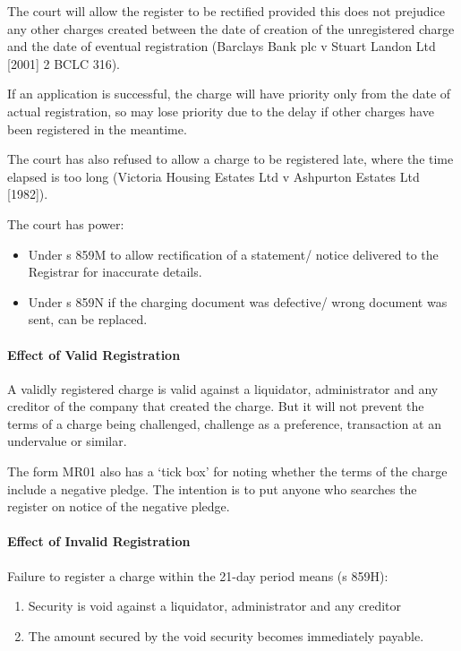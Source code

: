\documentclass[
]{article}
\providecommand{\tightlist}{%
  \setlength{\itemsep}{0pt}\setlength{\parskip}{0pt}}
\begin{document}
The court will allow the register to be rectified provided this does not
prejudice any other charges created between the date of creation of the
unregistered charge and the date of eventual registration (Barclays Bank
plc v Stuart Landon Ltd {[}2001{]} 2 BCLC 316).

If an application is successful, the charge will have priority only from
the date of actual registration, so may lose priority due to the delay
if other charges have been registered in the meantime.

The court has also refused to allow a charge to be registered late,
where the time elapsed is too long (Victoria Housing Estates Ltd v
Ashpurton Estates Ltd {[}1982{]}).

The court has power:

\begin{itemize}
\tightlist
\item
  Under s 859M to allow rectification of a statement/ notice delivered
  to the Registrar for inaccurate details.
\item
  Under s 859N if the charging document was defective/ wrong document
  was sent, can be replaced.
\end{itemize}

\hypertarget{effect-of-valid-registration}{%
\paragraph{Effect of Valid
Registration}\label{effect-of-valid-registration}}

A validly registered charge is valid against a liquidator, administrator
and any creditor of the company that created the charge. But it will not
prevent the terms of a charge being challenged, challenge as a
preference, transaction at an undervalue or similar.

The form MR01 also has a `tick box' for noting whether the terms of the
charge include a negative pledge. The intention is to put anyone who
searches the register on notice of the negative pledge.

\hypertarget{effect-of-invalid-registration}{%
\paragraph{Effect of Invalid
Registration}\label{effect-of-invalid-registration}}

Failure to register a charge within the 21-day period means (s 859H):

\begin{enumerate}
\tightlist
\item
  Security is void against a liquidator, administrator and any creditor
\item
  The amount secured by the void security becomes immediately payable.
\end{enumerate}
\end{document}

